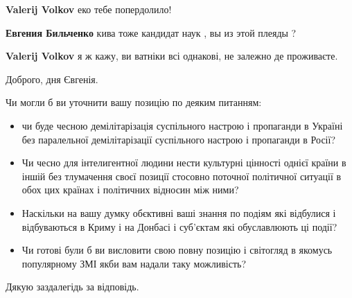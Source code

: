 \begin{itemize}
\begin{itemize}
\textbf{Valerij Volkov} еко тебе попердолило!

 
\textbf{Евгения Бильченко} кива тоже кандидат наук , вы из этой плеяды ?

 
\textbf{Valerij Volkov} я ж кажу, ви ватніки всі однакові, не залежно де проживаєте.

\end{itemize}


Доброго, дня Євгенія.

Чи могли б ви уточнити вашу позицію по деяким питанням:

\begin{itemize}
\item чи буде чесною демілітарізація суспільного настрою і пропаганди в Україні без
паралельної демілітарізації суспільного настрою і пропаганди в Росії?

\item Чи чесно для інтелигентної людини нести культурні цінності однієї країни в
іншій без тлумачення своєї позиції стосовно поточної політичної ситуації в обох
цих країнах і політичних відносин між ними?

\item Наскільки на вашу думку обєктивні ваші знання по подіям які відбулися і
відбуваються в Криму і на Донбасі і суб'єктам які обуславлюють ці події?

\item Чи готові були б ви висловити свою повну позицію і світогляд в якомусь
популярному ЗМІ якби вам надали таку можливість?
\end{itemize}

Дякую заздалегідь за відповідь.

\begin{itemize}
 

\end{itemize}
\end{itemize}

